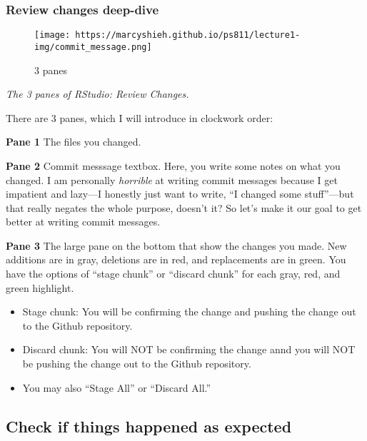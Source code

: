\documentclass[
]{book}
\providecommand{\tightlist}{%
  \setlength{\itemsep}{0pt}\setlength{\parskip}{0pt}}
\begin{document}
\hypertarget{review-changes-deep-dive}{%
\subsubsection{Review changes deep-dive}\label{review-changes-deep-dive}}

\begin{figure}
\centering
\texttt{[image: https://marcyshieh.github.io/ps811/lecture1-img/commit\_message.png]}
\caption{3 panes}
\end{figure}

\emph{The 3 panes of RStudio: Review Changes.}

There are 3 panes, which I will introduce in clockwork order:

\textbf{Pane 1} The files you changed.

\textbf{Pane 2} Commit messsage textbox. Here, you write some notes on what you changed. I am personally \emph{horrible} at writing commit messages because I get impatient and lazy---I honestly just want to write, ``I changed some stuff''---but that really negates the whole purpose, doesn't it? So let's make it our goal to get better at writing commit messages.

\textbf{Pane 3} The large pane on the bottom that show the changes you made. New additions are in gray, deletions are in red, and replacements are in green. You have the options of ``stage chunk'' or ``discard chunk'' for each gray, red, and green highlight.

\begin{itemize}
\tightlist
\item
  Stage chunk: You will be confirming the change and pushing the change out to the Github repository.
\item
  Discard chunk: You will NOT be confirming the change annd you will NOT be pushing the change out to the Github repository.
\item
  You may also ``Stage All'' or ``Discard All.''
\end{itemize}

\hypertarget{check-if-things-happened-as-expected}{%
\subsection{Check if things happened as expected}\label{check-if-things-happened-as-expected}}
\end{document}
